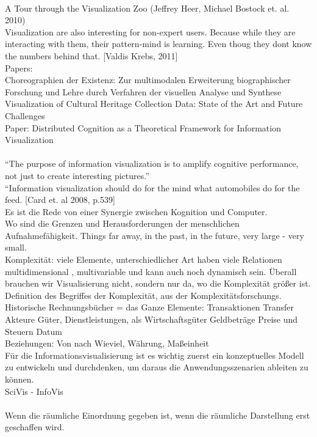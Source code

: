 \documentclass[12pt,a4paper]{article}
\begin{document}
\\
A Tour through the Visualization Zoo (Jeffrey Heer, Michael Bostock et. al. 2010)
\\
Visualization are also interesting for non-expert users.
Because while they are interacting with them, their pattern-mind is learning. Even thoug they dont know the numbers behind that. [Valdis Krebs, 2011]
\\
Papers:
\\
Choreographien der Existenz: Zur multimodalen Erweiterung biographischer Forschung und Lehre durch Verfahren der visuellen Analyse und Synthese
\\
Visualization of Cultural Heritage Collection Data: State of the Art and Future Challenges
\\
Paper:
Distributed Cognition as a Theoretical Framework for Information Visualization
\\
\\
“The purpose of information visualization is to amplify cognitive performance, not just to create interesting pictures.”
\\
“Information visualization should do for the mind what automobiles do for the feed.
[Card et. al 2008, p.539]
\\
Es ist die Rede von einer Synergie zwischen Kognition und Computer.
\\
Wo sind die Grenzen und Herausforderungen der menschlichen Aufnahmefähigkeit.
Things far away, in the past, in the future, very large - very small.
\\
Komplexität: viele Elemente, unterschiedlicher Art haben viele Relationen 
multidimensional , multivariable und kann auch noch dynamisch sein.
Überall brauchen wir Visualisierung nicht, sondern nur da, wo die Komplexität größer ist.  
Definition des Begriffes der Komplexität, aus der Komplexitätsforschungs.
\\
Historische Rechnungsbücher = das Ganze
Elemente: 
Transaktionen
Transfer
Akteure
Güter, Dienstleistungen, als Wirtschaftsgüter
Geldbeträge Preise und Steuern 
Datum
\\
Beziehungen:
Von nach
Wieviel, Währung, Maßeinheit
\\
Für die Informationsvisualisierung ist es wichtig zuerst ein konzeptuelles Modell zu entwickeln und durchdenken, um daraus die Anwendungsszenarien ableiten zu können.
\\
SciVis - InfoVis
\\
\\
Wenn die räumliche Einordnung gegeben ist, wenn die räumliche Darstellung erst geschaffen wird. 
\end{document}
